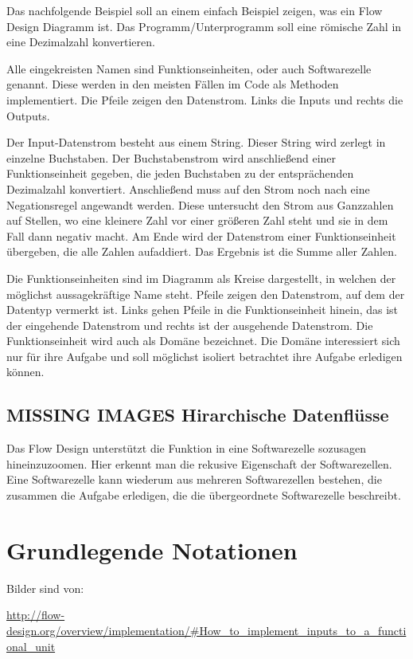 \documentclass[11pt]{article}
\begin{document}
Das nachfolgende Beispiel soll an einem einfach Beispiel zeigen, was ein Flow Design Diagramm ist.
Das Programm/Unterprogramm soll eine römische Zahl in eine Dezimalzahl konvertieren.

Alle eingekreisten Namen sind Funktionseinheiten, oder auch Softwarezelle genannt.
Diese werden in den meisten Fällen im Code als Methoden implementiert.
Die Pfeile zeigen den Datenstrom. Links die Inputs und rechts die Outputs.


Der Input-Datenstrom besteht aus einem String. Dieser String wird zerlegt in einzelne Buchstaben.
Der Buchstabenstrom wird anschließend einer Funktionseinheit gegeben, die jeden Buchstaben zu der entsprächenden 
Dezimalzahl konvertiert. Anschließend muss auf den Strom noch nach eine Negationsregel angewandt werden. Diese untersucht den
Strom aus Ganzzahlen auf Stellen, wo eine kleinere Zahl vor einer größeren Zahl steht und sie in dem Fall dann negativ macht.
Am Ende wird der Datenstrom einer Funktionseinheit übergeben, die alle Zahlen aufaddiert.
Das Ergebnis ist die Summe aller Zahlen. 

Die Funktionseinheiten sind im Diagramm als Kreise dargestellt, in welchen der möglichst aussagekräftige Name steht.
Pfeile zeigen den Datenstrom, auf dem der Datentyp vermerkt ist.
Links gehen Pfeile in die Funktionseinheit hinein, das ist der eingehende Datenstrom und rechts ist der ausgehende Datenstrom.
Die Funktionseinheit wird auch als Domäne bezeichnet. Die Domäne interessiert sich nur für ihre Aufgabe und soll möglichst isoliert
betrachtet ihre Aufgabe erledigen können.
\subsection{{\bfseries\sffamily MISSING IMAGES} Hirarchische Datenflüsse}
\label{sec:orgheadline3}
Das Flow Design unterstützt die Funktion in eine Softwarezelle sozusagen hineinzuzoomen.
Hier erkennt man die rekusive Eigenschaft der Softwarezellen. Eine Softwarezelle kann wiederum aus mehreren Softwarezellen bestehen,
die zusammen die Aufgabe erledigen, die die übergeordnete Softwarezelle beschreibt.


\section{Grundlegende Notationen}
\label{sec:orgheadline17}
Bilder sind von: 

\url{http://flow-design.org/overview/implementation/#How_to_implement_inputs_to_a_functional_unit}
\end{document}
